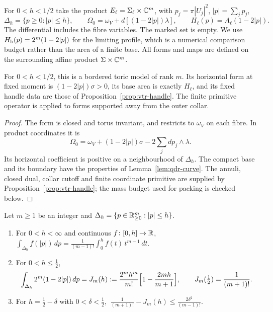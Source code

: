\begin{definition}\label{def:qdr-model}
For $0<h<1/2$ take the product $E_\ell=\Sigma_\ell\times\mathbb{C}^m$, with $p_j=\pi|U_j|^2$, $|p|=\sum_jp_j$,
\[
 \Delta_h=\{p\ge0:|p|\le h\},\qquad
 \Omega_0=\omega_V+d[(1-2|p|)\lambda],\qquad
 H_\ell(p)=A_\ell(1-2|p|).
\]
The differential includes the fibre variables. The marked set is empty.
We use $H_{\mathrm b}(p)=2^m(1-2|p|)$ for the limiting profile, which is a numerical comparison budget rather than the area
of a finite base. All forms and maps are defined on the surrounding affine product $\Sigma\times\mathbb{C}^m$.
\end{definition}

\begin{lemma}\label{lem:qdr-is-model}
For $0<h<1/2$, this is a bordered toric model of rank $m$. Its horizontal form at fixed moment is
$(1-2|p|)\sigma>0$, its base area is exactly $H_\ell$, and its fixed handle data are those of
Proposition~\ref{prop:vtr-handle}. The finite primitive operator is applied to forms supported away from the outer collar.
\end{lemma}

\begin{proof}
The form is closed and torus invariant, and restricts to $\omega_V$ on each fibre.
In product coordinates it is
\[
 \Omega_0=\omega_V+(1-2|p|)\sigma-2\sum_jdp_j\wedge\lambda.
\]
Its horizontal coefficient is positive on a neighbourhood of $\Delta_h$.
The compact base and its boundary have the properties of Lemma~\ref{lem:qdr-curve}.
The annuli, closed dual, collar cutoff and finite coordinate primitive are supplied by
Proposition~\ref{prop:vtr-handle}; the mass budget used for packing is checked below.
\end{proof}

\begin{lemma}\label{lem:qdr-volume}
Let $m\ge1$ be an integer and $\Delta_h=\{p\in\mathbb{R}^m_{\ge0}:|p|\le h\}$.
\begin{enumerate}[label=(\alph*)]
\item For $0<h<\infty$ and continuous $f\colon[0,h]\to\mathbb{R}$,
$\int_{\Delta_h}f(|p|)\,dp=\frac1{(m-1)!}\int_0^hf(t)\,t^{m-1}\,dt$.
\item For $0<h\le\frac12$,
\[
 \int_{\Delta_h}2^m(1-2|p|)\,dp=J_m(h):=\frac{2^mh^m}{m!}\Bigl[1-\frac{2mh}{m+1}\Bigr],\qquad J_m(\tfrac12)=\frac1{(m+1)!}.
\]
\item For $h=\frac12-\delta$ with $0<\delta<\frac12$, $\ \frac1{(m+1)!}-J_m(h)\le\frac{2\delta^2}{(m-1)!}$.
\end{enumerate}
\end{lemma}

